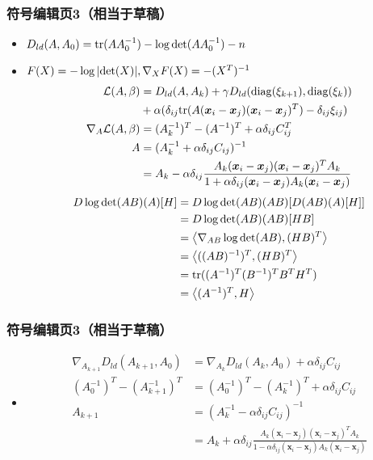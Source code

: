 \documentclass{beamer}
\begin{document}
\begin{frame}\frametitle{符号编辑页3（相当于草稿）}
\begin{itemize}
\item $D_{ld}(A,A_0)={\rm tr}(AA_{0}^{-1})-\log{\rm det}(AA_{0}^{-1})-n$
\item $F(X)=-\log|{\rm det}(X)|,\nabla_{X}F(X)=-(X^{T})^{-1}$
\begin{equation}
\begin{split}
\mathcal{L}(A,\beta)&=D_{ld}(A,A_k)+\gamma D_{ld}({\rm diag}(\xi_{k+1}),{\rm diag}(\xi_k))\\
&+\alpha(\delta_{ij}{\rm tr}(A(\bm{x}_{i}-\bm{x}_{j})(\bm{x}_{i}-\bm{x}_{j})^{T})-\delta_{ij}\xi_{ij})\\
\nabla_{A}\mathcal{L}(A,\beta)&=(A_{k}^{-1})^{T}-(A^{-1})^{T}+\alpha \delta_{ij}C_{ij}^{T}\\
A&=(A_{k}^{-1}+\alpha \delta_{ij}C_{ij})^{-1}\\
&=A_{k}-\alpha\delta_{ij}\frac{A_{k}(\bm{x}_i-\bm{x}_j)(\bm{x}_i-\bm{x}_j)^{T}A_{k}}{1+\alpha\delta_{ij}(\bm{x}_i-\bm{x}_j)A_{k}(\bm{x}_i-\bm{x}_j)}
\end{split}
\end{equation}
\begin{equation}
\begin{split}
D\log{\rm det}(AB)(A)[H]&=D\log{\rm det}(AB)(AB)[D(AB)(A)[H]]\\
&=D\log{\rm det}(AB)(AB)[HB]\\
&=\left<\nabla_{AB}\log{\rm det}(AB),(HB)^{T}\right>\\
&=\left<((AB)^{-1})^{T},(HB)^{T}\right>\\
&={\rm tr}((A^{-1})^{T}(B^{-1})^{T}B^{T}H^{T})\\
&=\left<(A^{-1})^{T},H \right>
\end{split}
\end{equation}
\end{itemize}
\end{frame}
\begin{frame}\frametitle{符号编辑页3（相当于草稿）}
\begin{itemize}
\item   
\begin{equation}
\begin{split}
\nabla_{A_{k+1}}D_{ld}(A_{k+1},A_0)&=\nabla_{A_{k}}D_{ld}(A_{k},A_0)+\alpha \delta_{ij}C_{ij}\\
(A_{0}^{-1})^{T}-(A_{k+1}^{-1})^{T}&=(A_{0}^{-1})^{T}-(A_{k}^{-1})^{T}+\alpha \delta_{ij}C_{ij}\\
A_{k+1}&=(A_{k}^{-1}-\alpha \delta_{ij}C_{ij})^{-1}\\
&=A_{k}+\alpha\delta_{ij}\frac{A_{k}(\bm{x}_i-\bm{x}_j)(\bm{x}_i-\bm{x}_j)^{T}A_{k}}{1-\alpha\delta_{ij}(\bm{x}_i-\bm{x}_j)A_{k}(\bm{x}_i-\bm{x}_j)}
\end{split}
\end{equation}
\end{itemize}
\end{frame}
\end{document}
